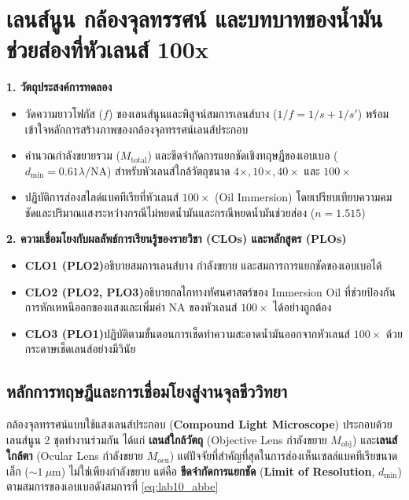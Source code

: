 \chapter{เลนส์นูน กล้องจุลทรรศน์ และบทบาทของน้ำมันช่วยส่องที่หัวเลนส์ 100x}

\begin{planbox}
\textbf{1. วัตถุประสงค์การทดลอง}
\begin{itemize}
    \item วัดความยาวโฟกัส ($f$) ของเลนส์นูนและพิสูจน์สมการเลนส์บาง ($1/f = 1/s + 1/s'$) พร้อมเข้าใจหลักการสร้างภาพของกล้องจุลทรรศน์เลนส์ประกอบ
    \item คำนวณกำลังขยายรวม ($M_{\text{total}}$) และขีดจำกัดการแยกชัดเชิงทฤษฎีของเอบเบอ ($d_{\min} = 0.61\lambda/\text{NA}$) สำหรับหัวเลนส์ใกล้วัตถุขนาด $4\times, 10\times, 40\times$ และ $100\times$
    \item ปฏิบัติการส่องสไลด์แบคทีเรียที่หัวเลนส์ $100\times$ (Oil Immersion) โดยเปรียบเทียบความคมชัดและปริมาณแสงระหว่างกรณีไม่หยดน้ำมันและกรณีหยดน้ำมันช่วยส่อง ($n = 1.515$)
\end{itemize}
\textbf{2. ความเชื่อมโยงกับผลลัพธ์การเรียนรู้ของรายวิชา (CLOs) และหลักสูตร (PLOs)}
\begin{itemize}
    \item \textbf{CLO1 (PLO2)}\quad อธิบายสมการเลนส์บาง กำลังขยาย และสมการการแยกชัดของเอบเบอได้
    \item \textbf{CLO2 (PLO2, PLO3)}\quad อธิบายกลไกทางทัศนศาสตร์ของ Immersion Oil ที่ช่วยป้องกันการหักเหหนีออกของแสงและเพิ่มค่า NA ของหัวเลนส์ $100\times$ ได้อย่างถูกต้อง
    \item \textbf{CLO3 (PLO1)}\quad ปฏิบัติตามขั้นตอนการเช็ดทำความสะอาดน้ำมันออกจากหัวเลนส์ $100\times$ ด้วยกระดาษเช็ดเลนส์อย่างมีวินัย
\end{itemize}
\end{planbox}

\section{หลักการทฤษฎีและการเชื่อมโยงสู่งานจุลชีววิทยา}

กล้องจุลทรรศน์แบบใช้แสงเลนส์ประกอบ (\textbf{Compound Light Microscope}) ประกอบด้วยเลนส์นูน 2 ชุดทำงานร่วมกัน ได้แก่ \textbf{เลนส์ใกล้วัตถุ} (Objective Lens กำลังขยาย $M_{\text{obj}}$) และ\textbf{เลนส์ใกล้ตา} (Ocular Lens กำลังขยาย $M_{\text{ocu}}$) แต่ปัจจัยที่สำคัญที่สุดในการส่องเห็นเซลล์แบคทีเรียขนาดเล็ก ($\sim 1\ \mu\text{m}$) ไม่ใช่เพียงกำลังขยาย แต่คือ \textbf{ขีดจำกัดการแยกชัด} (\textbf{Limit of Resolution}, $d_{\min}$) ตามสมการของเอบเบอดังสมการที่ \eqref{eq:lab10_abbe}

